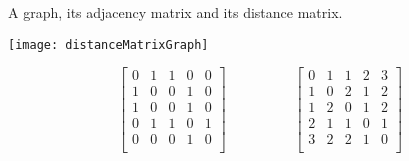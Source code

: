 \begin{Boxample}
A graph, its adjacency matrix and its distance matrix.\\

\begin{minipage}[c]{0.3\textwidth}
\centering
\texttt{[image: distanceMatrixGraph]}
\end{minipage}
\begin{minipage}[c]{0.65\textwidth}
$$\left[
\begin{array}{ccccc}
0 & 1 & 1 & 0 & 0 \\
1 & 0 & 0 & 1 & 0 \\
1 & 0 & 0 & 1 & 0 \\
0 & 1 & 1 & 0 & 1 \\
0 & 0 & 0 & 1 & 0 \\
\end{array}
\right]
\hspace{2cm}
\left[
\begin{array}{ccccc}
0 & 1 & 1 & 2 & 3 \\
1 & 0 & 2 & 1 & 2 \\
1 & 2 & 0 & 1 & 2 \\
2 & 1 & 1 & 0 & 1 \\
3 & 2 & 2 & 1 & 0 \\
\end{array}
\right]$$
\end{minipage} 
\end{Boxample}



